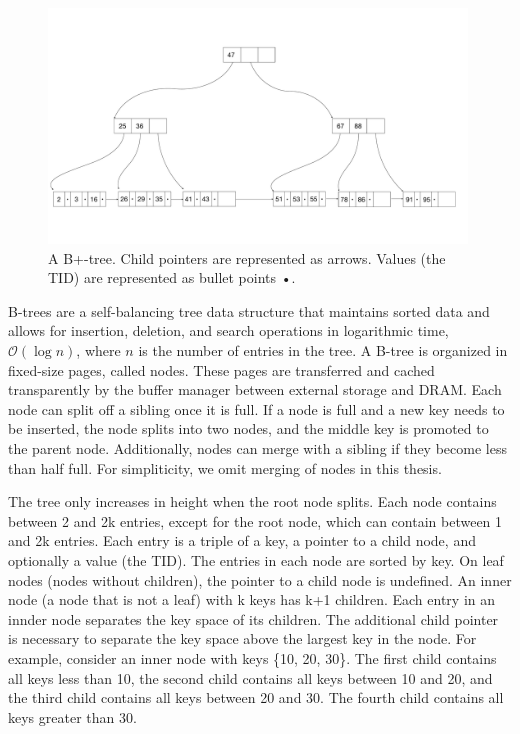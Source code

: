 \begin{figure}[htpb]
  \centering
  \includegraphics[width=0.99\textwidth]{figures/b_tree.pdf}
  \caption{A B+-tree. Child pointers are represented as arrows. Values (the \ac{TID}) are represented as bullet points •.}
  \label{fig:B-tree}
\end{figure}

B-trees \cite{bayer1970organization} are a self-balancing tree data structure that maintains sorted data and allows for insertion, deletion, and search operations in logarithmic time, $\mathcal{O}(\log n)$, where $n$ is the number of entries in the tree.
A B-tree is organized in fixed-size pages, called nodes. These pages are transferred and cached transparently by the buffer manager between external storage and \ac{DRAM}.
Each node can split off a sibling once it is full. If a node is full and a new key needs to be inserted, the node splits into two nodes, and the middle key is promoted to the parent node.
Additionally, nodes can merge with a sibling if they become less than half full. For simpliticity, we omit merging of nodes in this thesis.

The tree only increases in height when the root node splits.
Each node contains between 2 and 2k entries, except for the root node, which can contain between 1 and 2k entries.
Each entry is a triple of a key, a pointer to a child node, and optionally a value (the \ac{TID}).
The entries in each node are sorted by key. On leaf nodes (nodes without children), the pointer to a child node is undefined.
An inner node (a node that is not a leaf) with k keys has k+1 children.
Each entry in an innder node separates the key space of its children.
The additional child pointer is necessary to separate the key space above the largest key in the node.
For example, consider an inner node with keys \{10, 20, 30\}.
The first child contains all keys less than 10, the second child contains all keys between 10 and 20, and the third child contains all keys between 20 and 30. 
The fourth child contains all keys greater than 30.


